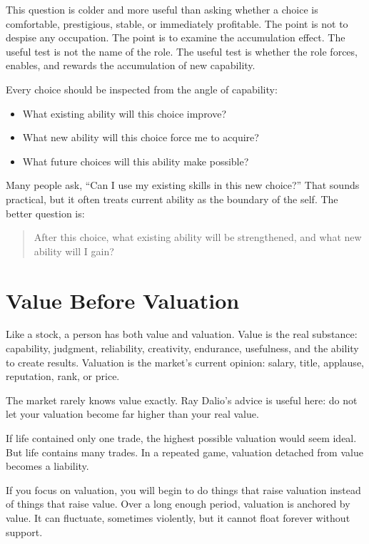 This question is colder and more useful than asking whether a choice is comfortable, prestigious, stable, or immediately profitable. The point is not to despise any occupation. The point is to examine the accumulation effect. The useful test is not the name of the role. The useful test is whether the role forces, enables, and rewards the accumulation of new capability.

Every choice should be inspected from the angle of capability:

\begin{itemize}
\item What existing ability will this choice improve?
\item What new ability will this choice force me to acquire?
\item What future choices will this ability make possible?
\end{itemize}

Many people ask, ``Can I use my existing skills in this new choice?'' That sounds practical, but it often treats current ability as the boundary of the self. The better question is:

\begin{quote}
After this choice, what existing ability will be strengthened, and what new ability will I gain?
\end{quote}

\section*{Value Before Valuation}

Like a stock, a person has both value and valuation. Value is the real substance: capability, judgment, reliability, creativity, endurance, usefulness, and the ability to create results. Valuation is the market's current opinion: salary, title, applause, reputation, rank, or price.

The market rarely knows value exactly. Ray Dalio's advice is useful here: do not let your valuation become far higher than your real value.

If life contained only one trade, the highest possible valuation would seem ideal. But life contains many trades. In a repeated game, valuation detached from value becomes a liability.

If you focus on valuation, you will begin to do things that raise valuation instead of things that raise value. Over a long enough period, valuation is anchored by value. It can fluctuate, sometimes violently, but it cannot float forever without support.

